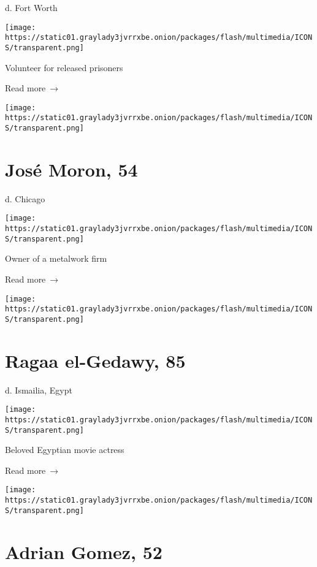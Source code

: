 d. Fort Worth

\texttt{[image: https://static01.graylady3jvrrxbe.onion/packages/flash/multimedia/ICONS/transparent.png]}

Volunteer for released prisoners

 Read more~→

\href{https://www.nytimes3xbfgragh.onion/2020/07/13/obituaries/jose-moron-dead-coronavirus.html}{}

\texttt{[image: https://static01.graylady3jvrrxbe.onion/packages/flash/multimedia/ICONS/transparent.png]}

\hypertarget{josuxe9-moron-54}{%
\section{José Moron, 54}\label{josuxe9-moron-54}}

d. Chicago

\texttt{[image: https://static01.graylady3jvrrxbe.onion/packages/flash/multimedia/ICONS/transparent.png]}

Owner of a metalwork firm

 Read more~→

\href{https://www.nytimes3xbfgragh.onion/2020/07/11/obituaries/ragaa-el-gedawy-dead-coronavirus.html}{}

\texttt{[image: https://static01.graylady3jvrrxbe.onion/packages/flash/multimedia/ICONS/transparent.png]}

\hypertarget{ragaa-el-gedawy-85}{%
\section{Ragaa el-Gedawy, 85}\label{ragaa-el-gedawy-85}}

d. Ismailia, Egypt

\texttt{[image: https://static01.graylady3jvrrxbe.onion/packages/flash/multimedia/ICONS/transparent.png]}

Beloved Egyptian movie actress

 Read more~→

\href{https://www.nytimes3xbfgragh.onion/2020/07/10/obituaries/adrian-gomez-dead-coronavirus.html}{}

\texttt{[image: https://static01.graylady3jvrrxbe.onion/packages/flash/multimedia/ICONS/transparent.png]}

\hypertarget{adrian-gomez-52}{%
\section{Adrian Gomez, 52}\label{adrian-gomez-52}}


